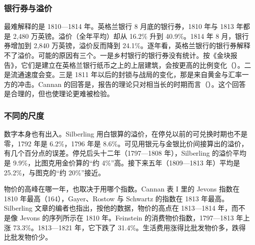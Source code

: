 \subsubsection{银行券与溢价}
最难解释的是 1810—1814 年。英格兰银行 8 月底的银行券，1810 年与 1813 年都是 2,480 万英镑。溢价（全年平均）却从 16.2\% 升到 40.9\%。1814 年 8 月，银行券增加到 2,840 万英镑，溢价反而降到 24.1\%\cite{cannan1919,silberling1919}。逐年看，英格兰银行的银行券解释不了溢价。可能的原因有三个。一是乡村银行的银行券没有统计。按《金块报告》，它们是建立在英格兰银行纸币之上的上层建筑，会按更高的比例变化（）。二是流通速度会变。三是 1811 年以后的封锁与战局的变化，那是来自黄金与汇率一方的冲击。Cannan 的回答是，报告的理论只对相当长的时期而言（）。这个回答是合理的，但也使理论更难被检验。

\subsubsection{不同的尺度}
数字本身也有出入。Silberling 用白银算的溢价，在停兑以前的可兑换时期也不是零，1792 年是 6.2\%，1796 年是 8.6\%\cite{silberling1919}。可见用银元与金银比价间接算出的溢价，有几个百分点的误差。停兑后头十二年（1797—1808 年），Silberling 的溢价平均是 9.9\%，比图克用金价算的“约 4\%”高。接下来五年（1809—1813 年）平均是 25.2\%，与图克的“约 20\%”接近\cite{silberling1919,tooke1838}。

物价的高峰在哪一年，也取决于用哪个指数。Cannan 表 I 里的 Jevons 指数在 1810 年最高（164），Gayer、Rostow 与 Schwartz 的指数在 1813 年最高。Silberling 文章的编者也指出，按他的数据，物价的高点在 1813—1814 年，而不是像 Jevons 的序列所示在 1810 年\cite{silberling1919,cannan1919}。Feinstein 的消费物价指数，1797—1813 年上涨 73.3\%。1813—1821 年，它下跌了 31.4\%\cite{feinstein1998,boe2017}。生活费用涨得比批发物价多，跌得比批发物价少。

